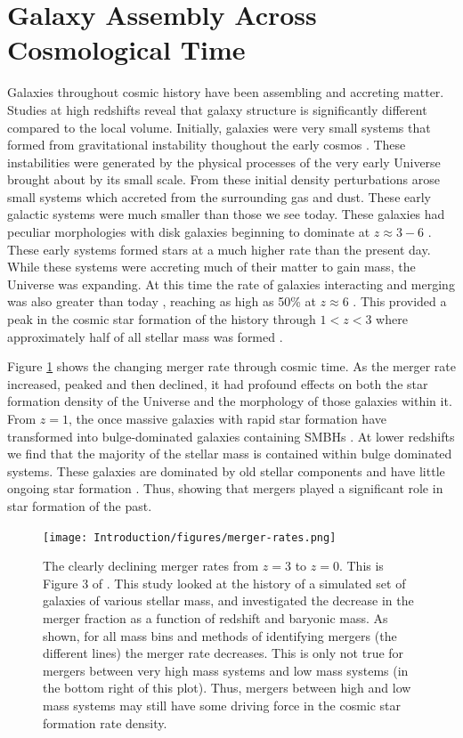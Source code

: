 \section{Galaxy Assembly Across Cosmological Time}
\noindent Galaxies throughout cosmic history have been assembling and accreting matter. Studies at high redshifts reveal that galaxy structure is significantly different compared to the local volume. Initially, galaxies were very small systems that formed from gravitational instability thoughout the early cosmos \citep{1993MNRAS.262..627L}. These instabilities were generated by the physical processes of the very early Universe brought about by its small scale. From these initial density perturbations arose small systems which accreted from the surrounding gas and dust. These early galactic systems were much smaller than those we see today. These galaxies had peculiar morphologies \citep{2005ApJ...627..632E} with disk galaxies beginning to dominate at $z\approx3 - 6$ \citep{2022ApJ...938L...2F}. These early systems formed stars at a much higher rate than the present day. While these systems were accreting much of their matter to gain mass, the Universe was expanding. At this time the rate of galaxies interacting and merging was also greater than today \citep{2010ApJ...715..202H, 2011ApJ...742..103L}, reaching as high as 50\% at $z\approx6$ \citep{2009MNRAS.397..208C, 2009MNRAS.394L..51B}. This provided a peak in the cosmic star formation of the history through $1 < z < 3$ where approximately half of all stellar mass was formed \citep{2005ApJ...625..621B}.

Figure \ref{fig:merger-rate} shows the changing merger rate through cosmic time. As the merger rate increased, peaked and then declined, it had profound effects on both the star formation density of the Universe and the morphology of those galaxies within it. From $z = 1$, the once massive galaxies with rapid star formation have transformed into bulge-dominated galaxies containing SMBHs \citep{2007ApJ...654..858B}. At lower redshifts we find that the majority of the stellar mass is contained within bulge dominated systems. These galaxies are dominated by old stellar components and have little ongoing star formation \citep{2002AJ....124..646H, 2004ApJ...608..752B}. Thus, showing that mergers played a significant role in star formation of the past. 

\begin{figure}
\centering
\texttt{[image: Introduction/figures/merger-rates.png]}
\caption[The declining merger rates from z = 3 to z = 0.]{The clearly declining merger rates from $z = 3$ to $z = 0$. This is Figure 3 of \citet{2010ApJ...715..202H}. This study looked at the history of a simulated set of galaxies of various stellar mass, and investigated the decrease in the merger fraction as a function of redshift and baryonic mass. As shown, for all mass bins and methods of identifying mergers (the different lines) the merger rate decreases. This is only not true for mergers between very high mass systems and low mass systems (in the bottom right of this plot). Thus, mergers between high and low mass systems may still have some driving force in the cosmic star formation rate density.}
\label{fig:merger-rate}
\end{figure}

